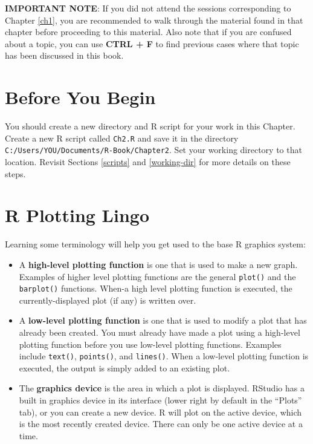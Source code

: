 \documentclass[]{book}
\providecommand{\tightlist}{%
  \setlength{\itemsep}{0pt}\setlength{\parskip}{0pt}}
\begin{document}
\textbf{IMPORTANT NOTE}: If you did not attend the sessions corresponding to Chapter \ref{ch1}, you are recommended to walk through the material found in that chapter before proceeding to this material. Also note that if you are confused about a topic, you can use \textbf{CTRL + F} to find previous cases where that topic has been discussed in this book.

\hypertarget{before-you-begin-1}{%
\section*{Before You Begin}\label{before-you-begin-1}}

You should create a new directory and R script for your work in this Chapter. Create a new R script called \texttt{Ch2.R} and save it in the directory \texttt{C:/Users/YOU/Documents/R-Book/Chapter2}. Set your working directory to that location. Revisit Sections \ref{scripts} and \ref{working-dir} for more details on these steps.

\hypertarget{r-plotting-lingo}{%
\section{R Plotting Lingo}\label{r-plotting-lingo}}

Learning some terminology will help you get used to the base R graphics system:

\begin{itemize}
\tightlist
\item
  A \textbf{high-level plotting function} is one that is used to make a new graph. Examples of higher level plotting functions are the general \texttt{plot()} and the \texttt{barplot()} functions. When-a high level plotting function is executed, the currently-displayed plot (if any) is written over.
\item
  A \textbf{low-level plotting function} is one that is used to modify a plot that has already been created. You must already have made a plot using a high-level plotting function before you use low-level plotting functions. Examples include \texttt{text()}, \texttt{points()}, and \texttt{lines()}. When a low-level plotting function is executed, the output is simply added to an existing plot.
\item
  The \textbf{graphics device} is the area in which a plot is displayed. RStudio has a built in graphics device in its interface (lower right by default in the ``Plots'' tab), or you can create a new device. R will plot on the active device, which is the most recently created device. There can only be one active device at a time.
\end{itemize}
\end{document}
